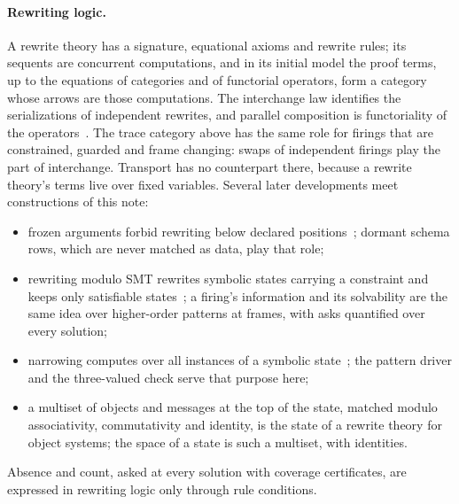 \documentclass[11pt]{article}
\theoremstyle{remark}
\begin{document}
\paragraph{Rewriting logic.} A rewrite theory has a signature, equational axioms and rewrite rules; its
sequents are concurrent computations, and in its initial model the proof terms, up to the equations of
categories and of functorial operators, form a category whose arrows are those computations. The
interchange law identifies the serializations of independent rewrites, and parallel composition is
functoriality of the operators~\cite{meseguer92}. The trace category above has the same role for firings
that are constrained, guarded and frame changing: swaps of independent firings play the part of
interchange. Transport has no counterpart there, because a rewrite theory's terms live over fixed
variables. Several later developments meet constructions of this note:
\begin{itemize}
\item frozen arguments forbid rewriting below declared positions~\cite{brunimeseguer06}; dormant schema
  rows, which are never matched as data, play that role;
\item rewriting modulo SMT rewrites symbolic states carrying a constraint and keeps only satisfiable
  states~\cite{rochameseguer17}; a firing's information and its solvability are the same idea over higher-order
  patterns at frames, with asks quantified over every solution;
\item narrowing computes over all instances of a symbolic state~\cite{meseguerthati07}; the pattern driver
  and the three-valued check serve that purpose here;
\item a multiset of objects and messages at the top of the state, matched modulo associativity,
  commutativity and identity, is the state of a rewrite theory for object systems; the space of a state
  is such a multiset, with identities.
\end{itemize}
Absence and count, asked at every solution with coverage certificates, are expressed in rewriting logic
only through rule conditions.
\end{document}
